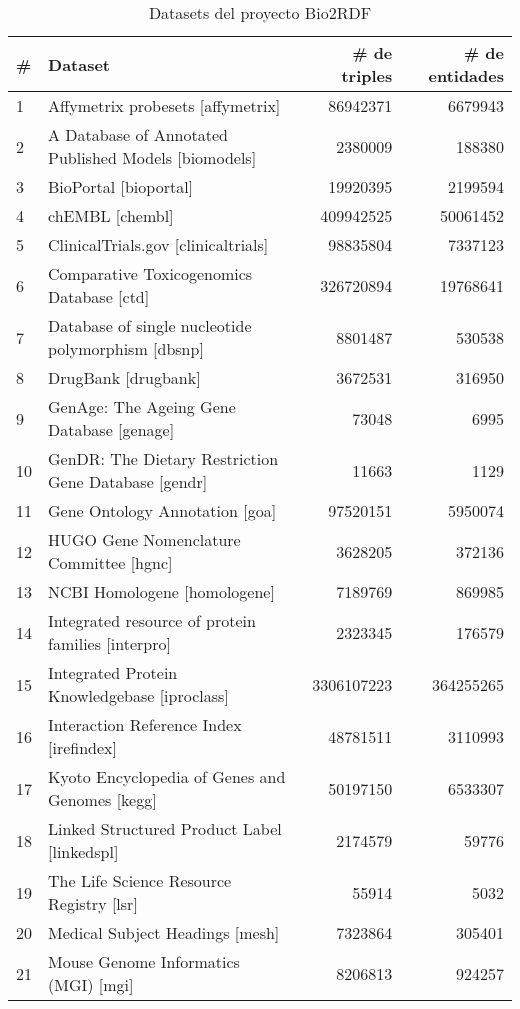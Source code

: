 \begin{table}[]
\centering
\caption{Datasets del proyecto Bio2RDF}
\label{tab:bio2RDFdataset}
\begin{tabular}{|l|l|r|r|}
  \hline
  \bf{\#} & \bf{Dataset} & \bf{\# de triples} & \bf{\# de entidades} \\\hline
  1 & Affymetrix probesets [affymetrix] & 86942371 & 6679943\\\hline
  2 & A Database of Annotated Published Models [biomodels] & 2380009 & 188380\\\hline
  3 & BioPortal [bioportal] & 19920395 & 2199594\\\hline
  4 & chEMBL [chembl] & 409942525 & 50061452\\\hline
  5 & ClinicalTrials.gov [clinicaltrials] & 98835804 & 7337123\\\hline
  6 & Comparative Toxicogenomics Database [ctd] & 326720894 & 19768641\\\hline
  7 & Database of single nucleotide polymorphism [dbsnp] & 8801487 & 530538\\\hline
  8 & DrugBank [drugbank] & 3672531 & 316950\\\hline
  9 & GenAge: The Ageing Gene Database [genage] & 73048 & 6995\\\hline
  10 & GenDR: The Dietary Restriction Gene Database [gendr] & 11663 & 1129\\\hline
  11 & Gene Ontology Annotation [goa] & 97520151 & 5950074\\\hline
  12 & HUGO Gene Nomenclature Committee [hgnc] & 3628205 & 372136\\\hline
  13 & NCBI Homologene [homologene] & 7189769 & 869985\\\hline
  14 & Integrated resource of protein families [interpro] & 2323345 & 176579\\\hline
  15 & Integrated Protein Knowledgebase [iproclass] & 3306107223 & 364255265\\\hline
  16 & Interaction Reference Index [irefindex] & 48781511 & 3110993\\\hline
  17 & Kyoto Encyclopedia of Genes and Genomes [kegg] & 50197150 & 6533307\\\hline
  18 & Linked Structured Product Label [linkedspl] & 2174579 & 59776\\\hline
  19 & The Life Science Resource Registry [lsr] & 55914 & 5032\\\hline
  20 & Medical Subject Headings [mesh] & 7323864 & 305401\\\hline
  21 & Mouse Genome Informatics (MGI) [mgi] & 8206813 & 924257\\\hline

\end{tabular}
\end{table}
